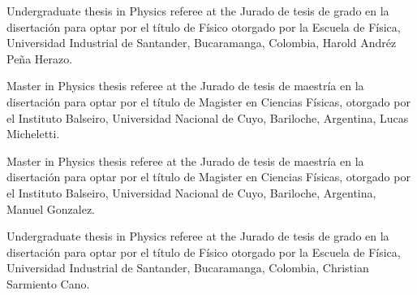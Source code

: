 \ifeng
Undergraduate thesis in Physics referee at the  
\else
Jurado de tesis de grado en la disertación para optar por el título de Físico otorgado por la 
\fi
Escuela de Física, Universidad Industrial de Santander, Bucaramanga, Colombia, Harold Andréz Peña Herazo.

\ifeng
Master in Physics thesis referee at the
\else
Jurado de tesis de maestría en la disertación para optar por el título de Magister en Ciencias Físicas, otorgado por el 
\fi
Instituto Balseiro, Universidad Nacional de Cuyo, Bariloche, Argentina, Lucas Micheletti.

\ifeng
Master in Physics thesis referee at the
\else
Jurado de tesis de maestría en la disertación para optar por el título de Magister en Ciencias Físicas, otorgado por el 
\fi
Instituto Balseiro, Universidad Nacional de Cuyo, Bariloche, Argentina, Manuel Gonzalez.

\ifeng
Undergraduate thesis in Physics referee at the  
\else
Jurado de tesis de grado en la disertación para optar por el título de Físico otorgado por la 
\fi
Escuela de Física, Universidad Industrial de Santander, Bucaramanga, Colombia, Christian Sarmiento Cano.
